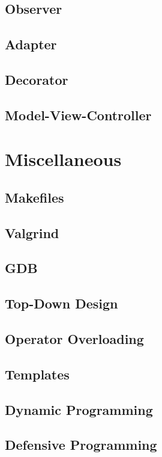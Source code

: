 \documentclass[letterpaper,10pt]{book}
\begin{document}
\chapter{Observer}
\chapter{Adapter}
\chapter{Decorator}
\chapter{Model-View-Controller}


\part{Miscellaneous}
\chapter{Makefiles}
\chapter{Valgrind}
\chapter{GDB}
\chapter{Top-Down Design}
\chapter{Operator Overloading}
\chapter{Templates}
\chapter{Dynamic Programming}
\chapter{Defensive Programming}
\end{document}
